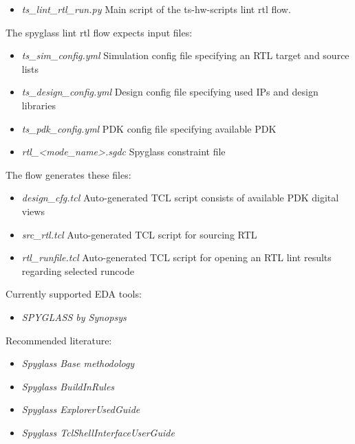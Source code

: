 \documentclass{tropic_design_spec}
\begin{document}
\begin{itemize}
    \item \textit{ts_lint_rtl_run.py} Main script of the ts-hw-scripts lint rtl flow.
\end{itemize}

The spyglass lint rtl flow expects input files:

\begin{itemize}
    \item \textit{ts_sim_config.yml} Simulation config file specifying an RTL target and source lists
    \item \textit{ts_design_config.yml} Design config file specifying used IPs and design libraries
    \item \textit{ts_pdk_config.yml} PDK config file specifying available PDK
    \item \textit{rtl_<mode_name>.sgdc} Spyglass constraint file
\end{itemize}

The flow generates these files:

\begin{itemize}
    \item \textit{design_cfg.tcl} Auto-generated TCL script consists of available PDK digital views
    \item \textit{src_rtl.tcl} Auto-generated TCL script for sourcing RTL
    \item \textit{rtl_runfile.tcl} Auto-generated TCL script for opening an RTL lint results regarding selected runcode
\end{itemize}

Currently supported EDA tools:

\begin{itemize}
    \item \textit{SPYGLASS by Synopsys} 
\end{itemize}

Recommended literature:
\begin{itemize}
    \item \textit{Spyglass Base methodology} 
    \item \textit{Spyglass BuildInRules} 
    \item \textit{Spyglass ExplorerUsedGuide} 
    \item \textit{Spyglass TclShellInterfaceUserGuide} 
\end{itemize}


\end{document}
